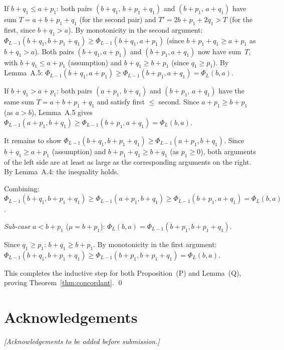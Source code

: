 \documentclass[11pt,titlepage]{article}
\begin{document}
If $b + q_1 \leq a + p_1$: both pairs
$(b + q_1,\, b + p_1 + q_1)$ and $(b + p_1,\, a + q_1)$
have sum $T = a + b + p_1 + q_1$ (for the second pair)
and $T' = 2b + p_1 + 2q_1 > T$ (for the first, since
$b + q_1 > a$). By monotonicity in the second argument:
$\Phi_{L-1}(b+q_1, b+p_1+q_1) \geq
\Phi_{L-1}(b+q_1, a+p_1)$ (since $b+p_1+q_1 \geq a+p_1$
as $b + q_1 > a$). Both pairs $(b+q_1, a+p_1)$ and
$(b+p_1, a+q_1)$ now have sum~$T$, with
$b+q_1 \leq a+p_1$ (assumption) and
$b+q_1 \geq b+p_1$ (since $q_1 \geq p_1$). By
Lemma~A.5:
$\Phi_{L-1}(b+q_1, a+p_1) \geq
\Phi_{L-1}(b+p_1, a+q_1) = \Phi_L(b,a)$. \checkmark

If $b + q_1 > a + p_1$: both pairs
$(a + p_1,\, b + q_1)$ and $(b + p_1,\, a + q_1)$
have the same sum $T = a + b + p_1 + q_1$ and satisfy
first $\leq$ second. Since $a + p_1 \geq b + p_1$
(as $a > b$), Lemma~A.5 gives
$\Phi_{L-1}(a+p_1, b+q_1) \geq
\Phi_{L-1}(b+p_1, a+q_1) = \Phi_L(b,a)$.

It remains to show
$\Phi_{L-1}(b+q_1, b+p_1+q_1) \geq
\Phi_{L-1}(a+p_1, b+q_1)$.
Since $b+q_1 \geq a+p_1$ (assumption) and
$b+p_1+q_1 \geq b+q_1$ (as $p_1 \geq 0$),
both arguments of the left side are at least as large
as the corresponding arguments on the right. By
Lemma~A.4: the inequality holds.

Combining:
$\Phi_{L-1}(b+q_1, b+p_1+q_1) \geq
\Phi_{L-1}(a+p_1, b+q_1) \geq
\Phi_{L-1}(b+p_1, a+q_1) = \Phi_L(b,a)$.
\checkmark

\emph{Sub-case $a < b + p_1$} ($\mu = b + p_1$):
$\Phi_L(b,a) = \Phi_{L-1}(b + p_1, b + p_1 + q_1)$.

Since $q_1 \geq p_1$: $b + q_1 \geq b + p_1$. By
monotonicity in the first argument:
$\Phi_{L-1}(b + q_1, b + p_1 + q_1) \geq
\Phi_{L-1}(b + p_1, b + p_1 + q_1) = \Phi_L(b,a)$.
\checkmark

\bigskip

This completes the inductive step for both
Proposition~(P) and Lemma~(Q),
proving Theorem~\ref{thm:concordant}. \qed


\section*{Acknowledgements}
\noindent\textit{[Acknowledgements to be added before submission.]}


\printbibliography
\end{document}

